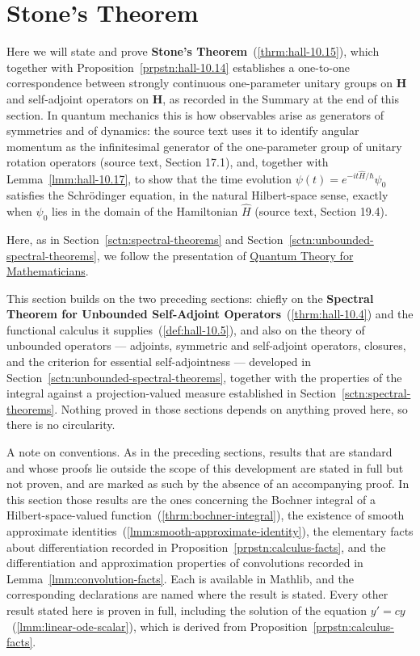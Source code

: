 \section{Stone's Theorem}\label{sctn:stones-theorem}
Here we will state and prove \textbf{Stone's Theorem}~(\ref{thrm:hall-10.15}), which together with Proposition~\ref{prpstn:hall-10.14} establishes a one-to-one correspondence between strongly continuous one-parameter unitary groups on $\mathbf{H}$ and self-adjoint operators on $\mathbf{H}$, as recorded in the Summary at the end of this section. In quantum mechanics this is how observables arise as generators of symmetries and of dynamics: the source text uses it to identify angular momentum as the infinitesimal generator of the one-parameter group of unitary rotation operators (source text, Section 17.1), and, together with Lemma~\ref{lmm:hall-10.17}, to show that the time evolution $\psi(t) = e^{-it\hat{H}/\hbar}\psi_0$ satisfies the Schrödinger equation, in the natural Hilbert-space sense, exactly when $\psi_0$ lies in the domain of the Hamiltonian $\hat{H}$ (source text, Section 19.4).

Here, as in Section~\ref{sctn:spectral-theorems} and Section~\ref{sctn:unbounded-spectral-theorems}, we follow the presentation of \href{https://doi.org/10.1007/978-1-4614-7116-5}{Quantum Theory for Mathematicians}.

This section builds on the two preceding sections: chiefly on the \textbf{Spectral Theorem for Unbounded Self-Adjoint Operators}~(\ref{thrm:hall-10.4}) and the functional calculus it supplies~(\ref{def:hall-10.5}), and also on the theory of unbounded operators — adjoints, symmetric and self-adjoint operators, closures, and the criterion for essential self-adjointness — developed in Section~\ref{sctn:unbounded-spectral-theorems}, together with the properties of the integral against a projection-valued measure established in Section~\ref{sctn:spectral-theorems}. Nothing proved in those sections depends on anything proved here, so there is no circularity.

A note on conventions. As in the preceding sections, results that are standard and whose proofs lie outside the scope of this development are stated in full but not proven, and are marked as such by the absence of an accompanying proof. In this section those results are the ones concerning the Bochner integral of a Hilbert-space-valued function~(\ref{thrm:bochner-integral}), the existence of smooth approximate identities~(\ref{lmm:smooth-approximate-identity}), the elementary facts about differentiation recorded in Proposition~\ref{prpstn:calculus-facts}, and the differentiation and approximation properties of convolutions recorded in Lemma~\ref{lmm:convolution-facts}. Each is available in Mathlib, and the corresponding declarations are named where the result is stated. Every other result stated here is proven in full, including the solution of the equation $y' = cy$~(\ref{lmm:linear-ode-scalar}), which is derived from Proposition~\ref{prpstn:calculus-facts}.

